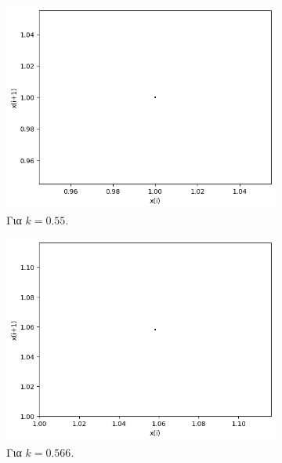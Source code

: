 \begin{figure}[h!]
	\centering
	
	\begin{subfigure}[b]{0.4\textwidth}
		\centering
		\includegraphics[width=\textwidth]{LateX images/graphs q12/g3}
		\caption{Για $k=0.55$.}
		\label{f:k59}
	\end{subfigure}
	\hfill
	\begin{subfigure}[b]{0.4\textwidth}
		\centering
		\includegraphics[width=\textwidth]{LateX images/graphs q12/g4}
		\caption{Για $k=0.566$.}
		\label{f:k60}
	\end{subfigure}
	\hfill
	\begin{subfigure}[b]{0.4\textwidth}
		\centering

\end{subfigure}
\end{figure}

